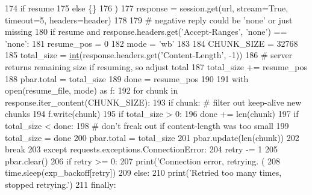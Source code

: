 \begin{DoxyCode}
{174                     \textcolor{keywordflow}{if} resume
175                     \textcolor{keywordflow}{else} \{\}
176                 )
177                 response = session.get(url, stream=\textcolor{keyword}{True}, timeout=5, headers=header)
178 
179                 \textcolor{comment}{# negative reply could be 'none' or just missing}
180                 \textcolor{keywordflow}{if} resume \textcolor{keywordflow}{and} response.headers.get(\textcolor{stringliteral}{'Accept-Ranges'}, \textcolor{stringliteral}{'none'}) == \textcolor{stringliteral}{'none'}:
181                     resume\_pos = 0
182                     mode = \textcolor{stringliteral}{'wb'}
183 
184                 CHUNK\_SIZE = 32768
185                 total\_size = \hyperlink{namespacelanguage__model_1_1eval__ppl_a7d12ee00479673c5c8d1f6d01faa272a}{int}(response.headers.get(\textcolor{stringliteral}{'Content-Length'}, -1))
186                 \textcolor{comment}{# server returns remaining size if resuming, so adjust total}
187                 total\_size += resume\_pos
188                 pbar.total = total\_size
189                 done = resume\_pos
190 
191                 with open(resume\_file, mode) \textcolor{keyword}{as} f:
192                     \textcolor{keywordflow}{for} chunk \textcolor{keywordflow}{in} response.iter\_content(CHUNK\_SIZE):
193                         \textcolor{keywordflow}{if} chunk:  \textcolor{comment}{# filter out keep-alive new chunks}
194                             f.write(chunk)
195                         \textcolor{keywordflow}{if} total\_size > 0:
196                             done += len(chunk)
197                             \textcolor{keywordflow}{if} total\_size < done:
198                                 \textcolor{comment}{# don't freak out if content-length was too small}
199                                 total\_size = done
200                                 pbar.total = total\_size
201                             pbar.update(len(chunk))
202                     \textcolor{keywordflow}{break}
203             \textcolor{keywordflow}{except} requests.exceptions.ConnectionError:
204                 retry -= 1
205                 pbar.clear()
206                 \textcolor{keywordflow}{if} retry >= 0:
207                     print(\textcolor{stringliteral}{'Connection error, retrying. (%
208                     time.sleep(exp\_backoff[retry])
209                 \textcolor{keywordflow}{else}:
210                     print(\textcolor{stringliteral}{'Retried too many times, stopped retrying.'})
211             \textcolor{keywordflow}{finally}:
}}
\end{DoxyCode}
